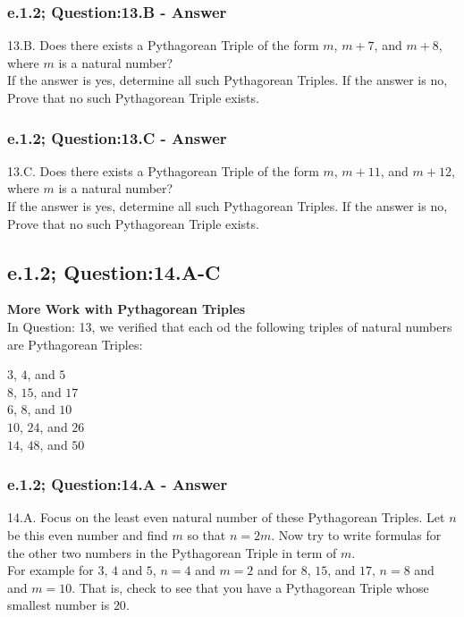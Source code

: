 \subsubsection*{e.1.2; Question:13.B - Answer}
13.B. Does there exists a Pythagorean Triple of the form $m$, $m+7$, and $m+8$, where $m$ is a natural number? \\
If the answer is yes, determine all such Pythagorean Triples. If the answer is no, Prove that no such Pythagorean Triple exists. \\

\subsubsection*{e.1.2; Question:13.C - Answer}
13.C. Does there exists a Pythagorean Triple of the form $m$, $m+11$, and $m+12$, where $m$ is a natural number? \\
If the answer is yes, determine all such Pythagorean Triples. If the answer is no, Prove that no such Pythagorean Triple exists. \\



\subsection{e.1.2; Question:14.A-C}
{\bf More Work with Pythagorean Triples} \\
In Question: 13, we verified that each od the following triples of natural numbers are Pythagorean Triples: \\

\begin{center}
$3$, $4$, and $5$ \\
$8$, $15$, and $17$ \\
$6$, $8$, and $10$ \\
$10$, $24$, and $26$ \\
$14$, $48$, and $50$ \\
\end{center}

\subsubsection*{e.1.2; Question:14.A - Answer}
14.A. Focus on the least even natural number of these Pythagorean Triples. Let $n$ be this even number and find $m$ so that $n = 2m$. Now try to write formulas for the other two numbers in the Pythagorean Triple in term of $m$. \\
For example for $3$, $4$ and $5$, $n = 4$ and $m = 2$ and for $8$, $15$, and $17$, $n = 8$ and and $m = 10$. That is, check to see that you have a Pythagorean Triple whose smallest number is $20$. \\

